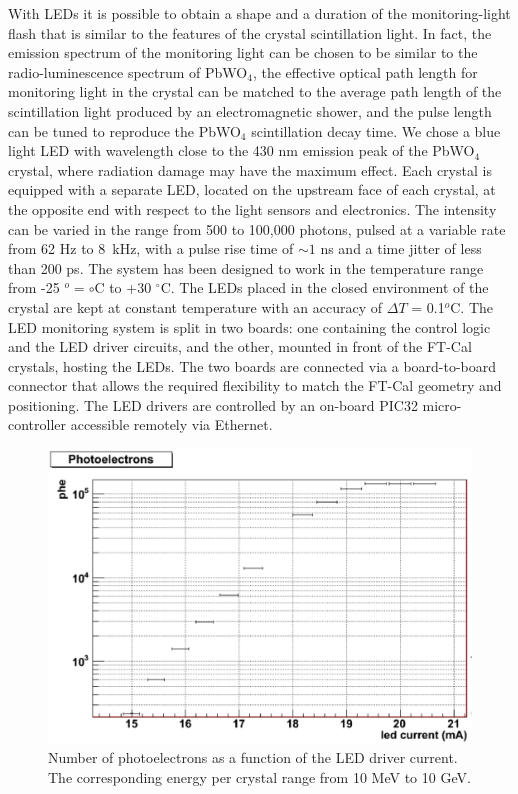 With LEDs it is
possible to obtain a shape and a duration
of the monitoring-light flash that is
similar to the features of the crystal scintillation light.
In fact, the emission spectrum of
the monitoring light can be chosen to be similar to
the radio-luminescence spectrum of PbWO$_4$,
the effective optical path length for monitoring
light in the crystal can be matched to
the average path length of the scintillation
light produced by an electromagnetic shower,
and the pulse length can be tuned to reproduce
the PbWO$_4$ scintillation decay time. We chose a blue light LED with wavelength close to the 430 nm emission
peak of the PbWO$_4$ crystal, where
radiation damage may have the maximum effect.
Each crystal is equipped with a separate LED, located on
the upstream face of each crystal, at the
opposite end with respect to the light sensors
and electronics. The intensity can be varied in
the range from 500 to 100,000 photons, pulsed at  a variable rate from 62 Hz to 8~kHz, with a pulse rise time of $\sim1$ ns and a time jitter of less than 200 ps. The system has been 
designed to work in the temperature range from -25 $^o=\circ$C to +30 
$^\circ$C. The LEDs placed in the closed
environment of the crystal are kept at
constant temperature with an accuracy of $\Delta T$ =
0.1$^o$C. The LED monitoring system is split in two
boards: one containing the control logic and
the LED driver circuits, and the other, 
mounted in front of the FT-Cal crystals, hosting
the LEDs. The two boards are connected
via a board-to-board connector that allows the
required flexibility to match the FT-Cal geometry
and positioning. The LED drivers are controlled by an on-board PIC32 micro-controller accessible remotely  via Ethernet.
\begin{figure}[th!]
\centering 
\includegraphics[width=1.0\columnwidth]{./fig/dynamics.eps}
\caption{Number of photoelectrons as a function
of the LED driver current. The corresponding energy
per crystal range from 10 MeV to 10 GeV.}
\label{fig:LEDperf1} 
\end{figure}
